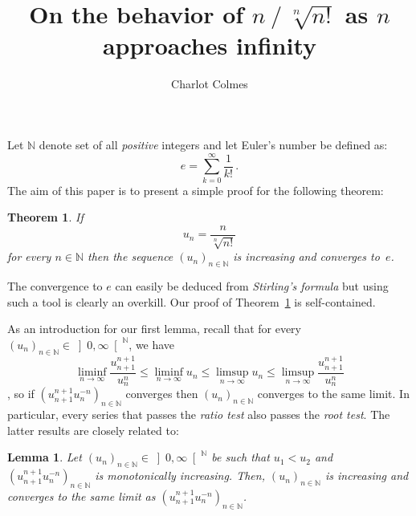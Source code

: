 \documentclass[12pt]{article}
\newcommand{\bN}{\mathbb{N}} %
\newcommand{\Rpos}{\left]0, \infty\right[} %
\newtheorem{theorem}{Theorem}
\newtheorem{lemma}{Lemma}
\begin{document}
\sloppy

\title{On the behavior of $n \mathbin{/} \sqrt[n]{n!}$ as $n$ approaches infinity} 
\author{Charlot Colmes}
\maketitle

Let $\bN$ denote set of all \emph{positive} integers and
let Euler's number be defined as:
$$
e = \sum_{k = 0}^\infty \frac{1}{k!} \,. 
$$
The aim of this paper is to present a simple proof for the following theorem:

\begin{theorem} \label{thm:factnn-e}
If
$$
u_n = \frac{n}{\sqrt[n]{n!}}
$$
for every $n \in \bN$ then
the sequence $\left( u_n  \right)_{n \in \bN}$ is increasing and converges to~$e$.
\end{theorem}

The convergence to $e$ can easily be deduced from \emph{Stirling's formula}
\cite{GiaquintaModicaApprox, RudinPrinciples}
but using such a tool is clearly an overkill.
Our proof of Theorem~\ref{thm:factnn-e} is self-contained.

As an introduction for our first lemma,
recall that for every $\left( u_n \right)_{n \in \bN} \in \Rpos^\bN$, we have 
$$
\liminf_{n \to \infty} \frac{u_{n + 1}^{n + 1}}{ u_n^{n}} 
\le
\liminf_{n \to \infty} u_n 
\le
\limsup_{n \to \infty} u_n
\le 
\limsup_{n \to \infty} \frac{u_{n + 1}^{n + 1}}{u_n^{n}} 
$$
\cite{RudinPrinciples},
so if $\left( u_{n + 1}^{n + 1} u_n^{- n} \right)_{n \in \bN}$ converges then
$\left( u_n \right)_{n \in \bN}$ converges to the same limit.
In particular, every series that passes the \emph{ratio test} also passes the \emph{root test}.
The latter results are closely related to:

\begin{lemma} \label{lem:root-vs-ratio}
  Let $\left( u_n \right)_{n \in \bN}  \in \Rpos^{\bN}$ be such that
  $u_1 < u_2$ and  
  $\left(  u_{n + 1}^{n + 1}  u_n^{-n} \right)_{n \in \bN}$ is monotonically increasing.
  Then,
  $\left(u_n \right)_{n \in \bN}$ is increasing and
  converges to the same limit as $\left(  u_{n + 1}^{n + 1}  u_n^{-n} \right)_{n \in \bN}$.
\end{lemma}
\end{document}
